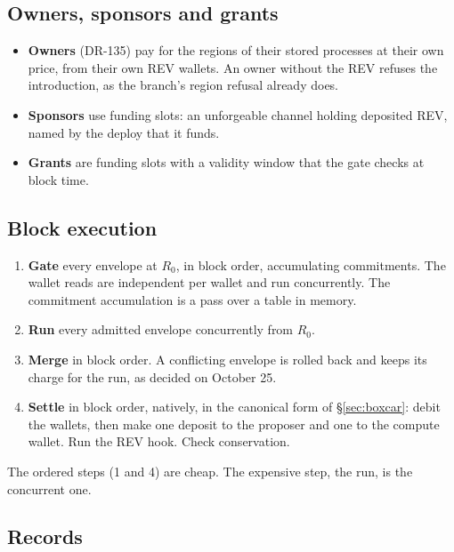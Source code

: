 \documentclass[11pt]{article}
\begin{document}
\subsection{Owners, sponsors and grants}

\begin{itemize}
\item \textbf{Owners} (DR-135) pay for the regions of their stored processes at their own price, from their own REV wallets. An owner without the REV refuses the introduction, as the branch's region refusal already does.
\item \textbf{Sponsors} use funding slots: an unforgeable channel holding deposited REV, named by the deploy that it funds.
\item \textbf{Grants} are funding slots with a validity window that the gate checks at block time.
\end{itemize}

\subsection{Block execution}

\begin{enumerate}
\item \textbf{Gate} every envelope at $R_0$, in block order, accumulating commitments. The wallet reads are independent per wallet and run concurrently. The commitment accumulation is a pass over a table in memory.
\item \textbf{Run} every admitted envelope concurrently from $R_0$.
\item \textbf{Merge} in block order. A conflicting envelope is rolled back and keeps its charge for the run, as decided on October 25.
\item \textbf{Settle} in block order, natively, in the canonical form of \S\ref{sec:boxcar}: debit the wallets, then make one deposit to the proposer and one to the compute wallet. Run the REV hook. Check conservation.
\end{enumerate}
The ordered steps (1 and 4) are cheap. The expensive step, the run, is the concurrent one.

\subsection{Records}
\end{document}
